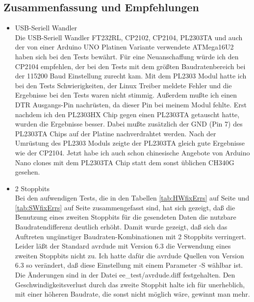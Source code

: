 \subsection{Zusammenfassung und Empfehlungen}
\begin{itemize}

\item{USB-Seriell Wandler} \\
Die USB-Seriell Wandler FT232RL, CP2102, CP2104, PL2303TA und auch der von einer Arduino UNO Platinen Variante
verwendete ATMega16U2 haben sich bei den Tests bewährt.
Für eine Neuanschaffung würde ich den CP2104 empfehlen,
der bei den Tests mit dem größten Baudratenbereich bei der 115200 Baud Einstellung zurecht kam.
Mit dem PL2303 Modul hatte ich bei den Tests Schwierigkeiten, der Linux Treiber meldete Fehler und
die Ergebnisse bei den Tests waren nicht stimmig. Außerdem mußte ich einen DTR Ausgangs-Pin nachrüsten,
da dieser Pin bei meinem Modul fehlte. 
Erst nachdem ich den PL2303HX Chip gegen einen PL2303TA getauscht hatte, wurden die Ergebnisse besser.
Dabei mußte zusätzlich der GND (Pin 7) des PL2303TA Chips auf der Platine nachverdrahtet werden.
Nach der Umrüstung des PL2303 Moduls zeigte der PL2303TA gleich gute Ergebnisse wie der CP2104.
Jetzt habe ich auch schon chinesische Angebote von Arduino Nano clones mit dem PL2303TA Chip
statt dem sonst üblichen CH340G gesehen.

\item{2 Stoppbits} \\
Bei den aufwendigen Tests, die in den Tabellen \ref{tab:HWfixErrs} auf Seite \pageref{tab:HWfixErrs}
und \ref{tab:SWfixErrs} auf Seite \pageref{tab:SWfixErrs} zusammengefasst sind,
hat sich gezeigt, daß die Benutzung eines zweiten Stoppbits für die
gesendeten Daten die nutzbare Baudratendifferenz deutlich erhöht.
Damit wurde gezeigt, daß sich das Auftreten ungünstiger Baudraten-Kombinationen mit 2 Stoppbits verringert.
Leider läßt der Standard avrdude mit Version 6.3 die Verwendung
eines zweiten Stoppbits nicht zu.
Ich hatte dafür die avrdude Quellen von Version 6.3 so verändert, daß diese Einstellung
mit einem Parameter -S wählbar ist.
Die Änderungen sind in der Datei ee\_test/avrdude.diff festgehalten.
Den Geschwindigkeitsverlust durch das zweite Stoppbit halte ich für unerheblich, mit einer
höheren Baudrate, die sonst nicht möglich wäre, gewinnt man mehr.


\end{itemize}
